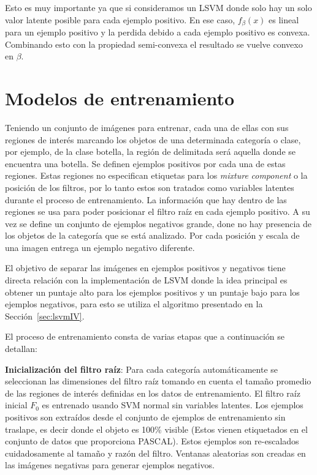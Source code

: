 Esto es muy importante ya que si consideramos un LSVM donde solo hay un solo valor latente posible para cada ejemplo positivo. En ese caso, $f_{\beta}(x)$ es lineal para un ejemplo positivo y la perdida debido a cada ejemplo positivo es convexa. Combinando esto con la propiedad semi-convexa el resultado se vuelve convexo en $\beta$.

\section{Modelos de entrenamiento}\label{subsec:t_models}

Teniendo un conjunto de imágenes para entrenar, cada una de ellas con sus regiones de interés marcando los objetos de una determinada categoría o clase, por ejemplo, de la clase botella, la región de delimitada será aquella donde se encuentra una botella. Se definen ejemplos positivos por cada una de estas regiones. Estas regiones no especifican etiquetas para los \textit{mixture} \textit{component} o la posición de los filtros, por lo tanto estos son tratados como variables latentes durante el proceso de entrenamiento. 
La información que hay dentro de las regiones se usa para poder posicionar el filtro raíz en cada ejemplo positivo. A su vez se define un conjunto de ejemplos negativos grande, done no hay presencia de los objetos de la categoría que se está analizado.
Por cada posición y escala de una imagen entrega un ejemplo negativo diferente.

El objetivo de separar las imágenes en ejemplos positivos y negativos tiene directa relación con la implementación de LSVM donde la idea principal es obtener un puntaje alto para los ejemplos positivos y un puntaje bajo para los ejemplos negativos, para esto se utiliza el algoritmo presentado en la Sección~\ref{sec:lsvmIV}.

El proceso de entrenamiento consta de varias etapas que a continuación se detallan:

\textbf{Inicialización del filtro raíz}:
Para cada categoría automáticamente se seleccionan las dimensiones del filtro raíz tomando en cuenta el tamaño promedio de las regiones de interés definidas en los datos de entrenamiento. El filtro raíz inicial $F_0$ es entrenado usando SVM normal sin variables latentes. Los ejemplos positivos son extraídos desde el conjunto de ejemplos de entrenamiento sin traslape, es decir donde el objeto es 100\% visible (Estos vienen etiquetados en el conjunto de datos que proporciona PASCAL). Estos ejemplos son re-escalados cuidadosamente al tamaño y razón del filtro. Ventanas aleatorias son creadas en las imágenes negativas para generar ejemplos negativos.

